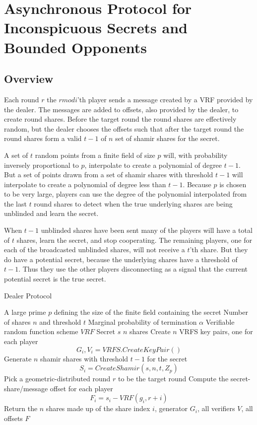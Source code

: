 \documentclass{dalcsthesis}
\begin{document}
\section{Asynchronous Protocol for Inconspicuous Secrets and Bounded Opponents}

\subsection{Overview}

Each round $r$ the $r mod i$'th player sends a message created by a VRF provided by the dealer. The messages are added to offsets, also provided by the dealer, to create round shares. Before the target round the round shares are effectively random, but the dealer chooses the offsets such that after the target round the round shares form a valid $t-1$ of $n$ set of shamir shares for the secret.

A set of $t$ random points from a finite field of size $p$ will, with probability inversely proportional to $p$, interpolate to create a polynomial of degree $t-1$. But a set of points drawn from a set of shamir shares with threshold $t-1$ will interpolate to create a polynomial of degree less than $t-1$. Because $p$ is chosen to be very large, players can use the degree of the polynomial interpolated from the last $t$ round shares to detect when the true underlying shares are being unblinded and learn the secret.

When $t-1$ unblinded shares have been sent many of the players will have a total of $t$ shares, learn the secret, and stop cooperating. The remaining players, one for each of the broadcasted unblinded shares, will not receive a $t$'th share. But they do have a potential secret, because the underlying shares have a threshold of $t-1$. Thus they use the other players disconnecting as a signal that the current potential secret is the true secret.

\begin{algorithm}
  \caption{Dealer Protocol}
  \label{alg:ABI_Dealer}
  \begin{algorithmic}
    \INPUT A large prime $p$ defining the size of the finite field containing the secret
    \INPUT Number of shares $n$ and threshold $t$
    \INPUT Marginal probability of termination $\alpha$
    \INPUT Verifiable random function scheme $VRF$
    \INPUT Secret $s$
    \OUTPUT $n$ shares
    \STATE Create $n$ VRFS key pairs, one for each player
    	$$G_i, V_i = VRFS.CreateKeyPair()$$
    \STATE Generate $n$ shamir shares with threshold $t-1$ for the secret
    	$$S_i = CreateShamir(s, n, t, Z_p)$$
    \STATE Pick a geometric-distributed round $r$ to be the target round
    \STATE Compute the secret-share/message offset for each player
    	$$F_i = s_i - VRF(g_i, r+i)$$
    \STATE Return the $n$ shares made up of the share index $i$, generator $G_i$, all verifiers $V$, all offsets $F$
  \end{algorithmic}
\end{algorithm}
\end{document}
